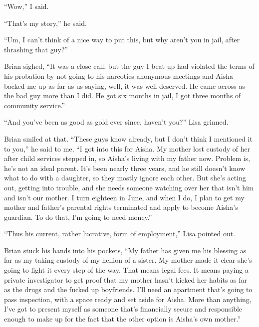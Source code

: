 ``Wow,'' I said.



``That's my story,'' he said.



``Um, I can't think of a nice way to put this, but why aren't you in jail, after thrashing that guy?''



Brian sighed, ``It was a close call, but the guy I beat up had violated the terms of his probation by not going to his narcotics anonymous meetings and Aisha backed me up as far as us saying, well, it was well deserved.  He came across as the bad guy more than I did.  He got six months in jail, I got three months of community service.''



``And you've been as good as gold ever since, haven't you?'' Lisa grinned.



Brian smiled at that.  ``These guys know already, but I don't think I mentioned it to you,'' he said to me, ``I got into this for Aisha.  My mother lost custody of her after child services stepped in, so Aisha's living with my father now.  Problem is, he's not an ideal parent.  It's been nearly three years, and he still doesn't know what to do with a daughter, so they mostly ignore each other.  But she's acting out, getting into trouble, and she needs someone watching over her that isn't him and isn't our mother.  I turn eighteen in June, and when I do, I plan to get my mother and father's parental rights terminated and apply to become Aisha's guardian.  To do that, I'm going to need money.''



``Thus his current, rather lucrative, form of employment,'' Lisa pointed out.



Brian stuck his hands into his pockets, ``My father has given me his blessing as far as my taking custody of my hellion of a sister.  My mother made it clear she's going to fight it every step of the way.  That means legal fees.  It means paying a private investigator to get proof that my mother hasn't kicked her habits as far as the drugs and the fucked up boyfriends.  I'll need an apartment that's going to pass inspection, with a space ready and set aside for Aisha.  More than anything, I've got to present myself as someone that's financially secure and responsible enough to make up for the fact that the other option is Aisha's own mother.''



